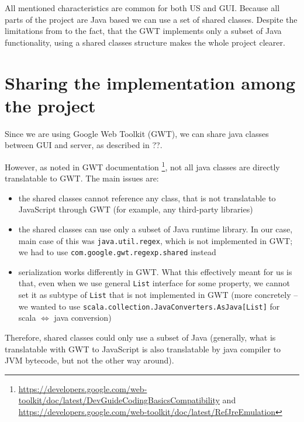 All mentioned characteristics are common for both US and GUI. Because all parts of the project are Java based we can use a set of shared classes. Despite the limitations from to the fact, that the GWT implements only a subset of Java functionality, using a shared classes structure makes the whole project clearer. 


\section{Sharing the implementation among the project}

Since we are using Google Web Toolkit (GWT), we can share java classes between GUI and server, as described in ??.

However, as noted in GWT documentation \footnote{\url{https://developers.google.com/web-toolkit/doc/latest/DevGuideCodingBasicsCompatibility} and \url{https://developers.google.com/web-toolkit/doc/latest/RefJreEmulation}}, not all java classes are directly translatable to GWT. The main issues are:

\begin{itemize}
\item the shared classes cannot reference any class, that is not translatable to JavaScript through GWT (for example, any third-party libraries)
\item the shared classes can use only a subset of Java runtime library. In our case, main case of this was \texttt{java.util.regex}, which is not implemented in GWT; we had to use \texttt{com.google.gwt.regexp.shared} instead
\item serialization works differently in GWT. What this effectively meant for us is that, even when we use general \texttt{List} interface for some property, we cannot set it as subtype of \texttt{List} that is not implemented in GWT (more concretely -- we wanted to use \texttt{scala.collection.JavaConverters.AsJava[List]} for scala $\Leftrightarrow$ java conversion)
\end{itemize}

Therefore, shared classes could only use a subset of Java (generally, what is translatable with GWT to JavaScript is also translatable by java compiler to JVM bytecode, but not the other way around).
